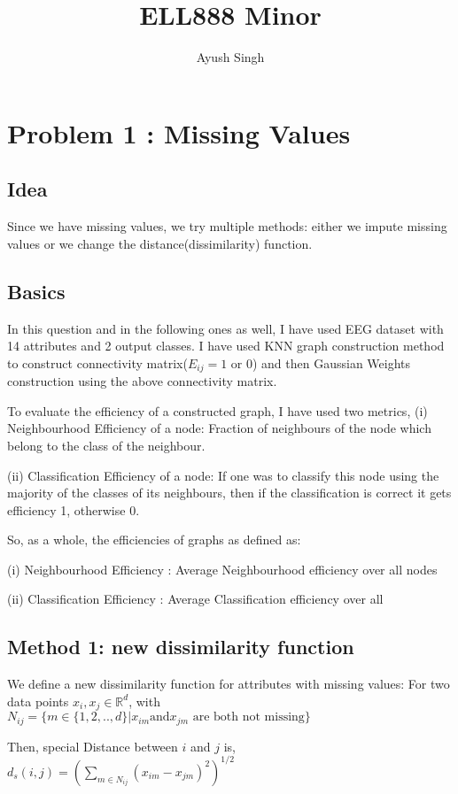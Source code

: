 \documentclass{article}
\title{ELL888 Minor}
\author{Ayush Singh}
\begin{document}
\maketitle


\section{Problem 1 : Missing Values}

\subsection{Idea}
Since we have missing values, we try multiple methods: either we impute missing values or we change the distance(dissimilarity) function.

\subsection{Basics}
In this question and in the following ones as well, I have used EEG dataset with 14 attributes and 2 output classes.
I have used KNN graph construction method to construct connectivity matrix($E_{ij} = 1$ or $0$) and then Gaussian Weights construction using the above connectivity matrix. 

To evaluate the efficiency of a constructed graph, I have used two metrics,
(i) Neighbourhood Efficiency of a node: Fraction of neighbours of the node which belong to the class of the neighbour.

(ii) Classification Efficiency of a node: If one was to classify this node using the majority of the classes of its neighbours, then if the classification is correct it gets efficiency 1, otherwise 0.

So, as a whole, the efficiencies of graphs as defined as:

(i) Neighbourhood Efficiency : Average Neighbourhood efficiency over all nodes

(ii) Classification Efficiency : Average Classification efficiency over all



\subsection{Method 1: new dissimilarity function}
We define a new dissimilarity function for attributes with missing values: 
For two data points $x_i, x_j \in \mathbb{R}^d$, with 
$N_{ij} = \{m \in \{1,2,..,d\} | x_{im} \text{and} x_{jm} \text{ are both not missing}\}$

Then,
special Distance between $i$ and $j$ is,
$d_s(i,j) = (\sum_{m \in N_{ij}}(x_{im} - x_{jm})^2)^{1/2}$



\end{document}
